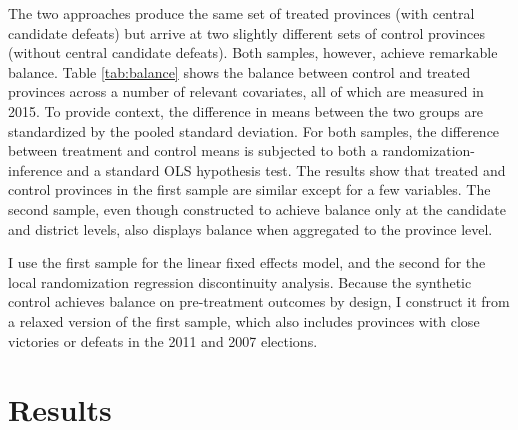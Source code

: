 \documentclass[12pt]{article}
\newcommand{\1}{\mathbbm{1}}
\begin{document}
The two approaches produce the same set of treated provinces (with central candidate defeats) but arrive at two slightly different sets of control provinces (without central candidate defeats). Both samples, however, achieve remarkable balance. Table \ref{tab:balance} shows the balance between control and treated provinces  across a number of relevant covariates, all of which are measured in 2015. To provide context, the difference in means between the two groups are standardized by the pooled standard deviation. For both samples, the difference between treatment and control means is subjected to both a randomization-inference and a standard OLS hypothesis test. The results show that treated and control provinces in the first sample are similar except for a few variables. The second sample, even though constructed to achieve balance only at the candidate and district levels, also displays balance when aggregated to the province level. 

I use the first sample for the linear fixed effects model, and the second for the local randomization regression discontinuity analysis. Because the synthetic control achieves balance on pre-treatment outcomes by design, I construct it from a relaxed version of the first sample, which also includes provinces with close victories or defeats in the 2011 and 2007 elections.



\section{Results}
\label{sec:results}

\end{document}
